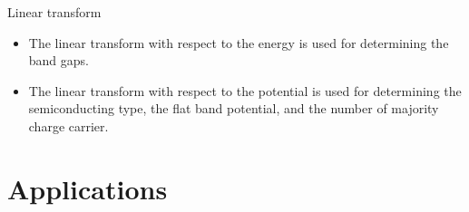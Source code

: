 \documentclass[10pt,compress]{beamer}
\begin{document}
    \begin{frame}[allowframebreaks=1.0]{Linear transform}
        \begin{itemize}
            \item The linear transform with respect to the energy is used for determining the band gaps. 
            \item The linear transform with respect to the potential  is used for determining 
                  the semiconducting type, the flat band potential, 
                  and the number of majority charge carrier.
        \end{itemize}
    \end{frame}

\section{Applications}
\end{document}

